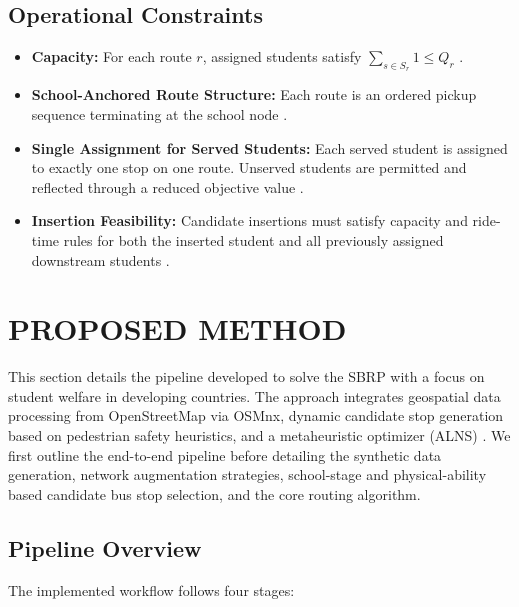 \documentclass[journal]{IEEEtran}
\begin{document}
\subsection{Operational Constraints}

\begin{itemize}

\item \textbf{Capacity:} For each route $r$, assigned students 
satisfy $\sum_{s \in S_r} 1 \le Q_r$ \cite{c15}.

\item \textbf{School-Anchored Route Structure:} Each route is an 
ordered pickup sequence terminating at the school node \cite{c5}.

\item \textbf{Single Assignment for Served Students:} Each served 
student is assigned to exactly one stop on one route. Unserved 
students are permitted and reflected through a reduced objective 
value \cite{c1}.

\item \textbf{Insertion Feasibility:} Candidate insertions must 
satisfy capacity and ride-time rules for both the inserted student 
and all previously assigned downstream students \cite{c9}.

\end{itemize}

\section{PROPOSED METHOD}

This section details the pipeline developed to solve the SBRP with 
a focus on student welfare in developing countries. The approach 
integrates geospatial data processing from OpenStreetMap 
via OSMnx, dynamic candidate stop generation based on 
pedestrian safety heuristics, and a metaheuristic optimizer 
(ALNS) \cite{c9}. We first outline the end-to-end pipeline before 
detailing the synthetic data generation, network augmentation 
strategies, school-stage and physical-ability based candidate bus 
stop selection, and the core routing algorithm.

\subsection{Pipeline Overview}

The implemented workflow follows four stages:
\end{document}
